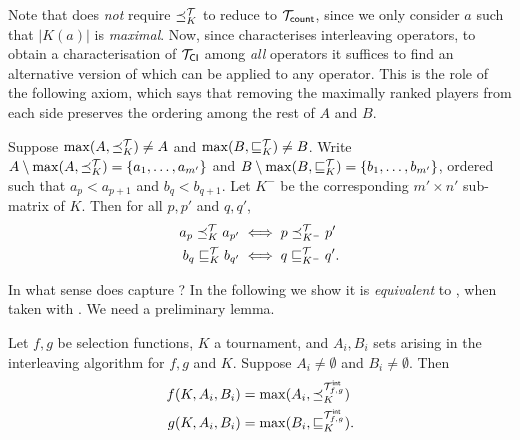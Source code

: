 Note that \argmaxaxiom{} does \emph{not} require $\preceq_K^{\mathcal{T}}$ to reduce to
${\mathcal{T}_{\mathsf{count}}}$, since we only consider $a$ such that $|K(a)|$ is \emph{maximal}.
%
Now, since \chaindef{} characterises interleaving operators, to obtain
a characterisation of ${\mathcal{T}_{\mathsf{CI}}}$ among \emph{all} operators it suffices to
find an alternative version of \smi{} which can be applied to any
operator. This is the role of the following axiom, which says that removing the
maximally ranked players from each side preserves the ordering among the rest
of $A$ and $B$.

\begin{axiom}[\rankremoval{}]
    Suppose $\max(A, {\preceq_K^{\mathcal{T}}}) \ne A$ and $\max(B, {\sqsubseteq_K^{\mathcal{T}}}) \ne B$.
    Write $A \setminus \max(A, {\preceq_K^{\mathcal{T}}}) = \{a_1, \ldots, a_{m'}\}$ and $B
    \setminus \max(B, {\sqsubseteq_K^{\mathcal{T}}}) = \{b_1, \ldots, b_{m'}\}$, ordered such
    that $a_p < a_{p+1}$ and $b_q < b_{q+1}$. Let $K^-$ be the corresponding
    $m' \times n'$ sub-matrix of $K$. Then for all $p, p'$ and $q, q'$,
    \begin{align*}
        a_p \preceq_K^{\mathcal{T}} a_{p'} &\iff p \preceq_{K^-}^{\mathcal{T}} p' \\
        b_q \sqsubseteq_K^{\mathcal{T}} b_{q'} &\iff q \sqsubseteq_{K^-}^{\mathcal{T}} q'.
    \end{align*}
\end{axiom}

In what sense does \rankremoval{} capture \smi{}? In the
following we show it is \emph{equivalent} to \smi{}, when taken with
\chaindef{}. We need a preliminary lemma.

\begin{lemma}
    \label{tourn_result_selectionfunction_lemma}
    Let $f, g$ be selection functions, $K$ a tournament, and $A_i, B_i$ sets
    arising in the interleaving algorithm for $f, g$ and $K$. Suppose $A_i \ne
    \emptyset$ and $B_i \ne \emptyset$. Then
    \begin{align*}
        f(K, A_i, B_i) &= \max(A_i, {\preceq_K^{{\mathcal{T}_{f, g}^\mathsf{int}}}}) \\
        g(K, A_i, B_i) &= \max(B_i, {\sqsubseteq_K^{{\mathcal{T}_{f, g}^\mathsf{int}}}}).
    \end{align*}
\end{lemma}

